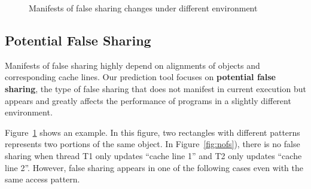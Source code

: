 
\begin{figure}
\begin{center} 
%
\hspace{30pt}
%
\hspace{30pt}
%
\end{center}
\caption{Manifests of false sharing changes under different environment}
\label{fig:potentialfalsesharing}
\end{figure}

\subsection{Potential False Sharing}
Manifests of false sharing highly depend on 
alignments of objects and corresponding cache lines.
Our prediction tool focuses on \textbf{potential false sharing},  the type of
false sharing that does not 
manifest in current execution but appears and greatly affects the performance of programs
in a slightly different environment.

Figure~\ref{fig:potentialfalsesharing} shows an  
example.
In this figure, two rectangles with different patterns
represents two portions of the same 
object. In Figure~\ref{fig:nofs}), there is no false sharing when thread T1 only updates 
``cache line 1'' and T2 only updates ``cache line 2''.
However, false sharing appears in one of the following cases even with the same
access pattern.

